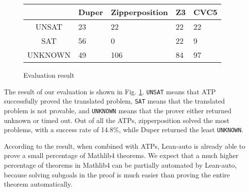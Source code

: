   \begin{figure}
  \begin{center}\begin{tabular}{| c K{6em} K{6em} K{6em} K{6em} |}
    \hline
            & Duper & Zipperposition & Z3 & CVC5 \\ \hline
    UNSAT   & 23    & 22             & 22 & 22   \\
    SAT     & 56    & 0              & 22 & 9    \\
    UNKNOWN & 49    & 106            & 84 & 97   \\ \hline
  \end{tabular}\end{center}
  \caption{Evaluation result} \label{figevalresult}
  \end{figure}

  The result of our evaluation is shown in Fig. \ref{figevalresult}. \texttt{UNSAT} means
  that ATP successfully proved the translated problem, \texttt{SAT} means that
  the translated problem is not provable, and \texttt{UNKNOWN} means that the prover
  either returned unknown or timed out. Out of all the ATPs, zipperposition solved the
  most problems, with a success rate of 14.8\%, while Duper returned the least \texttt{UNKNOWN}.
  
  According to the result, when combined with ATPs, Lean-auto is already able to
  prove a small percentage of Mathlib4 theorems. We expect that a much higher percentage
  of theorems in Mathlib4 can be partially automated by Lean-auto, because solving
  subgoals in the proof is much easier than proving the entire theorem automatically.